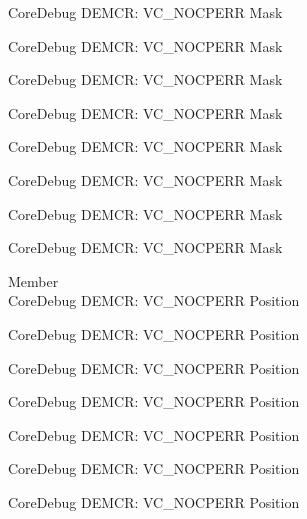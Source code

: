 \begin{DoxyRefList}
\label{deprecated__deprecated000517}%
%
Core\+Debug DEMCR\+: VC\+\_\+\+NOCPERR Mask 

\label{deprecated__deprecated000619}%
%
Core\+Debug DEMCR\+: VC\+\_\+\+NOCPERR Mask 

\label{deprecated__deprecated000725}%
%
Core\+Debug DEMCR\+: VC\+\_\+\+NOCPERR Mask 

\label{deprecated__deprecated000869}%
%
Core\+Debug DEMCR\+: VC\+\_\+\+NOCPERR Mask 

\label{deprecated__deprecated001011}%
%
Core\+Debug DEMCR\+: VC\+\_\+\+NOCPERR Mask 

\label{deprecated__deprecated001087}%
%
Core\+Debug DEMCR\+: VC\+\_\+\+NOCPERR Mask 

\label{deprecated__deprecated001176}%
%
Core\+Debug DEMCR\+: VC\+\_\+\+NOCPERR Mask 

\label{deprecated__deprecated001278}%
%
Core\+Debug DEMCR\+: VC\+\_\+\+NOCPERR Mask  
\item[Member \doxylink{group___c_m_s_i_s___core_debug_gac9d13eb2add61f610d5ced1f7ad2adf8}{Core\+Debug\+\_\+\+DEMCR\+\_\+\+VC\+\_\+\+NOCPERR\+\_\+\+Pos} ]\hfill \\
\label{deprecated__deprecated000065}%
%
Core\+Debug DEMCR\+: VC\+\_\+\+NOCPERR Position 

\label{deprecated__deprecated000209}%
%
Core\+Debug DEMCR\+: VC\+\_\+\+NOCPERR Position 

\label{deprecated__deprecated000351}%
%
Core\+Debug DEMCR\+: VC\+\_\+\+NOCPERR Position 

\label{deprecated__deprecated000427}%
%
Core\+Debug DEMCR\+: VC\+\_\+\+NOCPERR Position 

\label{deprecated__deprecated000516}%
%
Core\+Debug DEMCR\+: VC\+\_\+\+NOCPERR Position 

\label{deprecated__deprecated000618}%
%
Core\+Debug DEMCR\+: VC\+\_\+\+NOCPERR Position 

\label{deprecated__deprecated000724}%
%
Core\+Debug DEMCR\+: VC\+\_\+\+NOCPERR Position 


\end{DoxyRefList}
